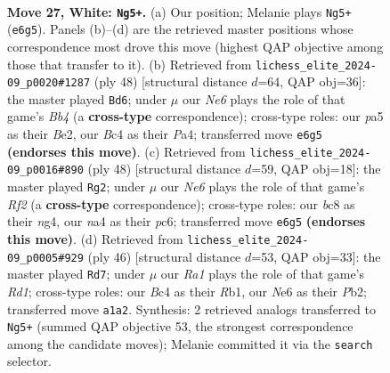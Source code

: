 \documentclass[11pt]{article}
\begin{document}
\clearpage

\begin{figure}[p]\centering
\begin{subfigure}{0.46\textwidth}\centering
\resizebox{\linewidth}{!}{%
\newchessgame
\chessboard[
  setfen={r1b4r/7k/p1n1N1p1/p3Pp1p/n1B2B2/P5P1/1P3P1P/RK1R4 w - - 1 27},
  showmover=false,
  pgfstyle=straightmove, color=movearrow, markmove={e6-g5}
]}
\caption{}
\end{subfigure}\hfill
\begin{subfigure}{0.46\textwidth}\centering
\resizebox{\linewidth}{!}{%
\newchessgame
\chessboard[
  setfen={r1r3k1/pp3ppp/2n5/3p1P2/PB1Pb1P1/2P5/R3B2P/5RK1 w - - 5 25},
  showmover=false,
  pgfstyle=straightmove, color=movearrow, markmove={b4-d6}
]}
\caption{}
\end{subfigure}
\\[4pt]
\begin{subfigure}{0.46\textwidth}\centering
\resizebox{\linewidth}{!}{%
\newchessgame
\chessboard[
  setfen={r3r1k1/1p3pp1/2p3Np/p1n2P2/P5n1/2P5/1PB2R1P/3R2K1 w - - 0 25},
  showmover=false,
  pgfstyle=straightmove, color=movearrow, markmove={f2-g2}
]}
\caption{}
\end{subfigure}\hfill
\begin{subfigure}{0.46\textwidth}\centering
\resizebox{\linewidth}{!}{%
\newchessgame
\chessboard[
  setfen={r1r4k/5pbp/pp4p1/1p6/2n5/P1P1BN1P/1P3PP1/1R1R2K1 w - - 2 24},
  showmover=false,
  pgfstyle=straightmove, color=movearrow, markmove={d1-d7}
]}
\caption{}
\end{subfigure}
\caption{\textbf{Move 27, White: \texttt{Ng5+}.} (a) Our position; Melanie plays \texttt{Ng5+} (\texttt{e6g5}). Panels (b)--(d) are the retrieved master positions whose correspondence most drove this move (highest QAP objective among those that transfer to it). (b) Retrieved from \texttt{lichess\_elite\_2024-09\_p0020\#1287} (ply 48) [structural distance $d$=64, QAP obj=36]: the master played \texttt{Bd6}; under $\mu$ our \emph{Ne6} plays the role of that game's \emph{Bb4} (a \textbf{cross-type} correspondence); cross-type roles: our \emph{p}a5 as their \emph{B}e2, our \emph{B}c4 as their \emph{P}a4; transferred move \texttt{e6g5} \textbf{(endorses this move)}. (c) Retrieved from \texttt{lichess\_elite\_2024-09\_p0016\#890} (ply 48) [structural distance $d$=59, QAP obj=18]: the master played \texttt{Rg2}; under $\mu$ our \emph{Ne6} plays the role of that game's \emph{Rf2} (a \textbf{cross-type} correspondence); cross-type roles: our \emph{b}c8 as their \emph{n}g4, our \emph{n}a4 as their \emph{p}c6; transferred move \texttt{e6g5} \textbf{(endorses this move)}. (d) Retrieved from \texttt{lichess\_elite\_2024-09\_p0005\#929} (ply 46) [structural distance $d$=53, QAP obj=33]: the master played \texttt{Rd7}; under $\mu$ our \emph{Ra1} plays the role of that game's \emph{Rd1}; cross-type roles: our \emph{B}c4 as their \emph{R}b1, our \emph{N}e6 as their \emph{P}b2; transferred move \texttt{a1a2}. Synthesis: 2 retrieved analogs transferred to \texttt{Ng5+} (summed QAP objective 53, the strongest correspondence among the candidate moves); Melanie committed it via the \texttt{search} selector.}
\label{fig:thought-m52}
\end{figure}
\end{document}

